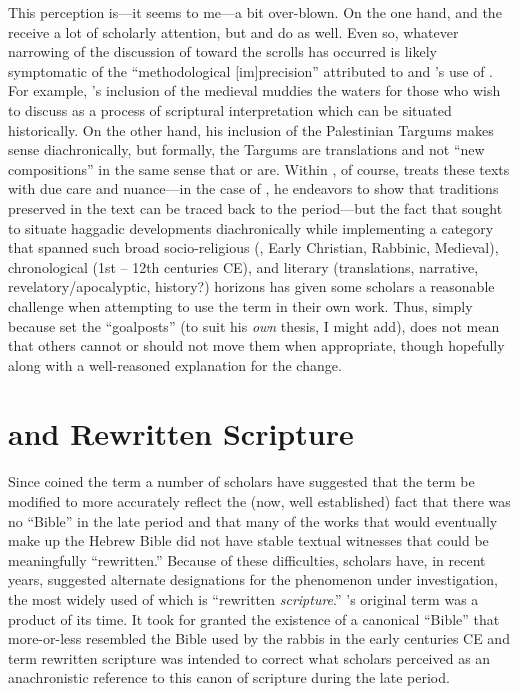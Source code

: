  This perception is---it seems to me---a bit over-blown. On the one hand, \ga and the \templescroll receive a lot of scholarly attention, but \jub and \ant do as well. Even so, whatever narrowing of the discussion of \rwb toward the \qumran scrolls has occurred is likely symptomatic of the ``methodological {[}im{]}precision'' attributed to  and \vermes's use of \rwB. For example, \vermes's inclusion of the medieval \sefer muddies the waters for those who wish to discuss \rwb as a process of scriptural interpretation which can be situated historically. On the other hand, his inclusion of the Palestinian Targums makes sense diachronically, but formally, the Targums are translations and not ``new compositions'' in the same sense that \jub or \ga are. Within , of course, \vermes treats these texts with due care and nuance---in the case of \sefer, he endeavors to show that traditions preserved in the text can be traced back to the \secondtemple period---but the fact that \vermes sought to situate haggadic developments diachronically while implementing a category that spanned such broad socio-religious (\qumran, Early Christian, Rabbinic, Medieval), chronological (1st -- 12th centuries CE), and literary (translations, narrative, revelatory/apocalyptic, history?) horizons has given some scholars a reasonable challenge when attempting to use the term in their own work. Thus, simply because \vermes set the ``goalposts'' (to suit his \emph{own} thesis, I might add), does not mean that others cannot or should not move them when appropriate, though hopefully along with a well-reasoned explanation for the change. 

 \hypertarget{rwb-and-rewritten-scripture}{%
\section{\RWB and Rewritten Scripture}\label{rwb-and-rewritten-scripture}} 

 Since \vermes coined the term \rwb a number of scholars have suggested that the term be modified to more accurately reflect the (now, well established) fact that there was no ``Bible'' in the late \secondtemple period and that many of the works that would eventually make up the Hebrew Bible did not have stable textual witnesses that could be meaningfully ``rewritten.'' Because of these difficulties, scholars have, in recent years, suggested alternate designations for the phenomenon under investigation, the most widely used of which is ``rewritten \emph{scripture}.'' \vermes's original term \rwb was a product of its time. It took for granted the existence of a canonical ``Bible'' that more-or-less resembled the Bible used by the rabbis in the early centuries CE and term rewritten scripture was intended to correct what scholars perceived as an anachronistic reference to this canon of scripture during the late \secondtemple period.\autocites[58--59]{campbell_zsengeller2014}[See also][]{ulrich_mcdonald-sanders2002}[and][]{ulrich_zsengeller2014} 

